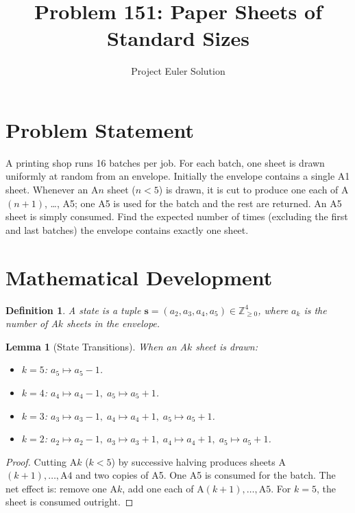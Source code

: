 \documentclass[12pt]{article}
\title{Problem 151: Paper Sheets of Standard Sizes}
\author{Project Euler Solution}
\date{}
\newtheorem{lemma}[theorem]{Lemma}
\newtheorem{definition}[theorem]{Definition}
\begin{document}
\maketitle

\section{Problem Statement}

A printing shop runs 16 batches per job. For each batch, one sheet is drawn uniformly at random from an envelope. Initially the envelope contains a single A1 sheet. Whenever an A$n$ sheet ($n < 5$) is drawn, it is cut to produce one each of A$(n{+}1)$, \ldots, A5; one A5 is used for the batch and the rest are returned. An A5 sheet is simply consumed. Find the expected number of times (excluding the first and last batches) the envelope contains exactly one sheet.

\section{Mathematical Development}

\begin{definition}
A \emph{state} is a tuple $\mathbf{s} = (a_2, a_3, a_4, a_5) \in \mathbb{Z}_{\ge 0}^4$, where $a_k$ is the number of A$k$ sheets in the envelope.
\end{definition}

\begin{lemma}[State Transitions]
\label{lem:transitions}
When an A$k$ sheet is drawn:
\begin{itemize}
    \item $k = 5$: $a_5 \mapsto a_5 - 1$.
    \item $k = 4$: $a_4 \mapsto a_4 - 1,\; a_5 \mapsto a_5 + 1$.
    \item $k = 3$: $a_3 \mapsto a_3 - 1,\; a_4 \mapsto a_4 + 1,\; a_5 \mapsto a_5 + 1$.
    \item $k = 2$: $a_2 \mapsto a_2 - 1,\; a_3 \mapsto a_3 + 1,\; a_4 \mapsto a_4 + 1,\; a_5 \mapsto a_5 + 1$.
\end{itemize}
\end{lemma}

\begin{proof}
Cutting A$k$ ($k < 5$) by successive halving produces sheets A$(k{+}1), \ldots, \text{A4}$ and two copies of A5. One A5 is consumed for the batch. The net effect is: remove one A$k$, add one each of A$(k{+}1), \ldots, \text{A5}$. For $k = 5$, the sheet is consumed outright.
\end{proof}
\end{document}
